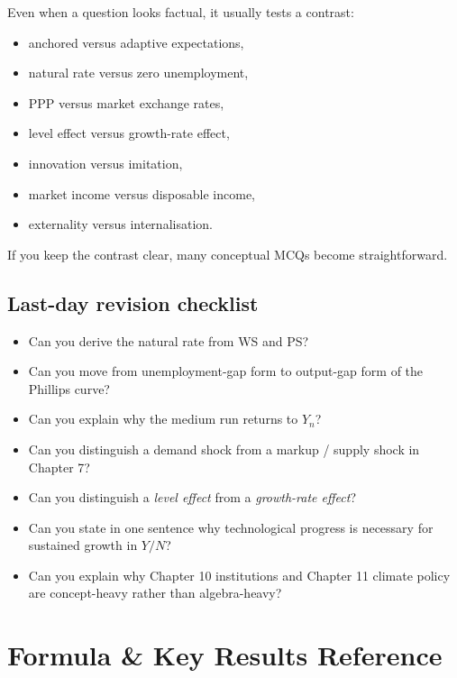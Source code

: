 \documentclass[12pt]{article}
\begin{document}
\begin{examtip}[title={Exam Focus: What MCQs are often really testing}]
Even when a question looks factual, it usually tests a contrast:
\begin{itemize}[leftmargin=1.5em]
\item anchored versus adaptive expectations,
\item natural rate versus zero unemployment,
\item PPP versus market exchange rates,
\item level effect versus growth-rate effect,
\item innovation versus imitation,
\item market income versus disposable income,
\item externality versus internalisation.
\end{itemize}
If you keep the contrast clear, many conceptual MCQs become straightforward.
\end{examtip}

\subsection{Last-day revision checklist}

\begin{itemize}[leftmargin=1.5em]
\item Can you derive the natural rate from WS and PS?
\item Can you move from unemployment-gap form to output-gap form of the Phillips curve?
\item Can you explain why the medium run returns to \(Y_n\)?
\item Can you distinguish a demand shock from a markup / supply shock in Chapter 7?
\item Can you distinguish a \emph{level effect} from a \emph{growth-rate effect}?
\item Can you state in one sentence why technological progress is necessary for sustained growth in \(Y/N\)?
\item Can you explain why Chapter 10 institutions and Chapter 11 climate policy are concept-heavy rather than algebra-heavy?
\end{itemize}

\newpage
\section{Formula \& Key Results Reference}
\end{document}
